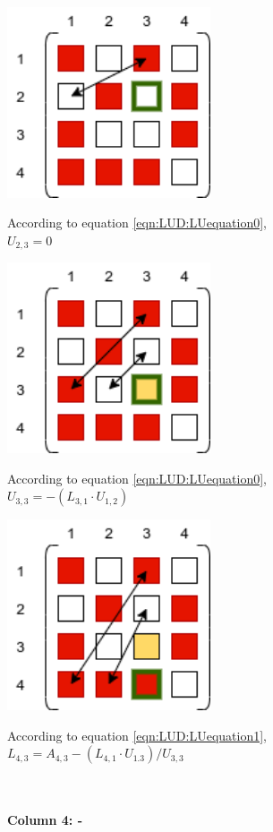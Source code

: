 \begin{minipage}{0.45\textwidth}
\includegraphics[width=0.45\textwidth]{./Scheduler/PpT-Symbolic_A21.png}
\end{minipage}%
\hfill
\begin{minipage}{0.85\textwidth}
According to equation \ref{eqn:LUD:LUequation0},\\
$U_{2,3}=0$
\end{minipage}


\begin{minipage}{0.45\textwidth}
\includegraphics[width=0.45\textwidth]{./Scheduler/PpT-Symbolic_A22.png}
\end{minipage}%
\hfill
\begin{minipage}{0.85\textwidth}
According to equation \ref{eqn:LUD:LUequation0},\\
$U_{3,3}=-(L_{3,1} \cdot U_{1,2})$
\end{minipage}

\begin{minipage}{0.45\textwidth}
\includegraphics[width=0.45\textwidth]{./Scheduler/PpT-Symbolic_A23.png}
\end{minipage}%
\hfill
\begin{minipage}{0.85\textwidth}
According to equation \ref{eqn:LUD:LUequation1},\\
$ L_{4,3}=A_{4,3} - ( L_{4,1} \cdot U_{1.3} )/U_{3,3} $
\end{minipage}
\\\\
\textbf{Column 4: -}

